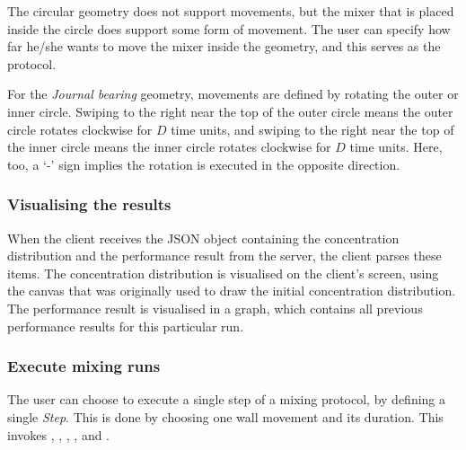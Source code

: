 The circular geometry does not support movements, but the mixer that is placed inside the circle does support some form of movement. The user can specify how far he/she wants to move the mixer inside the geometry, and this serves as the protocol.

For the \emph{Journal bearing} geometry, movements are defined by rotating the outer or inner circle. Swiping to the right near the top of the outer circle means the outer circle rotates clockwise for $D$ time units, and swiping to the right near the top of the inner circle means the inner circle rotates clockwise for $D$ time units. Here, too, a `-' sign implies the rotation is executed in the opposite direction.





\subsubsection{Visualising the results}
When the client receives the JSON object containing the concentration distribution and the performance result from the server, the client parses these items. The concentration distribution is visualised on the client's screen, using the canvas that was originally used to draw the initial concentration distribution. The performance result is visualised in a graph, which contains all previous performance results for this particular run.



\subsubsection{Execute mixing runs}
The user can choose to execute a single step of a mixing protocol, by defining a single \emph{Step}. This is done by choosing one wall movement and its duration. This invokes , , , ,  and .

